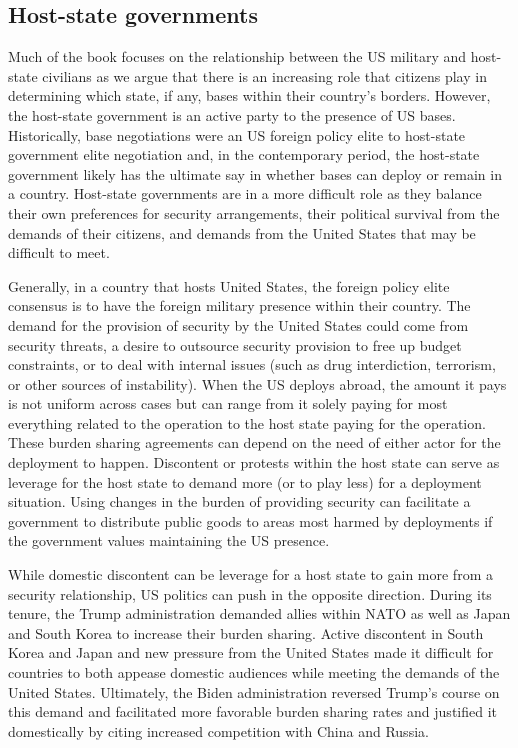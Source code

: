 \subsection*{Host-state governments}

Much of the book focuses on the relationship between the US military and host-state civilians as we argue that there is an increasing role that citizens play in determining which state, if any, bases within their country's borders. However, the host-state government is an active party to the presence of US bases. Historically, base negotiations were an US foreign policy elite to host-state government elite negotiation and, in the contemporary period, the host-state government likely has the ultimate say in whether bases can deploy or remain in a country. Host-state governments are in a more difficult role as they balance their own preferences for security arrangements, their political survival from the demands of their citizens, and demands from the United States that may be difficult to meet. 

Generally, in a country that hosts United States, the foreign policy elite consensus is to have the foreign military presence within their country. The demand for the provision of security by the United States could come from security threats, a desire to outsource security provision to free up budget constraints, or to deal with internal issues (such as drug interdiction, terrorism, or other sources of instability). When the US deploys abroad, the amount it pays is not uniform across cases but can range from it solely paying for most everything related to the operation to the host state paying for the operation. These burden sharing agreements can depend on the need of either actor for the deployment to happen. Discontent or protests within the host state can serve as leverage for the host state to demand more (or to play less) for a deployment situation. Using changes in the burden of providing security can facilitate a government to distribute public goods to areas most harmed by deployments if the government values maintaining the US presence.

While domestic discontent can be leverage for a host state to gain more from a security relationship, US politics can push in the opposite direction. During its tenure, the Trump administration demanded allies within NATO as well as Japan and South Korea to increase their burden sharing. Active discontent in South Korea and Japan and new pressure from the United States made it difficult for countries to both appease domestic audiences while meeting the demands of the United States. Ultimately, the Biden administration reversed Trump's course on this demand and facilitated more favorable burden sharing rates and justified it domestically by citing increased competition with China and Russia.

